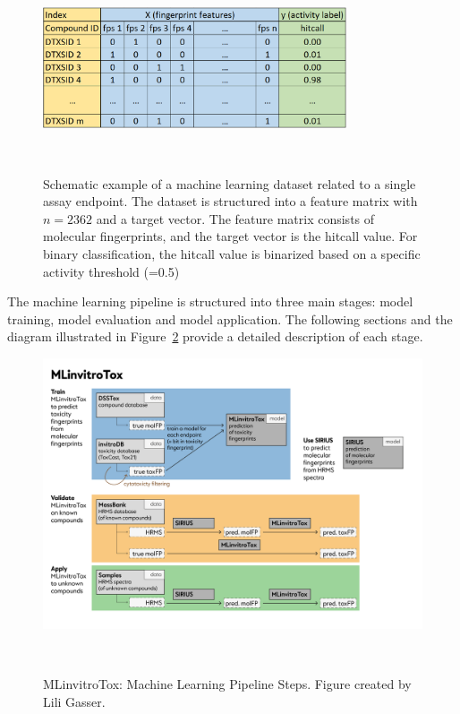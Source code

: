 \begin{figure}[h]
    \centering
    \includegraphics[width=0.8\textwidth]{figures/ml_dataset.png}
    \caption{Schematic example of a machine learning dataset related to a single assay endpoint. The dataset is structured into a feature matrix with $n=2362$ and a target vector. The feature matrix consists of molecular fingerprints, and the target vector is the hitcall value. For binary classification, the hitcall value is binarized based on a specific activity threshold (=0.5)}
~\label{fig:ml_dataset}
\end{figure}


The machine learning pipeline is structured into three main stages: model training, model evaluation and model application. The following sections and the diagram illustrated in Figure~\ref{fig:Project_overview} provide a detailed description of each stage.

\begin{figure}[h]
    \centering
    \includegraphics[width=1.0\textwidth]{figures/Project_overview.png}
    \caption{MLinvitroTox: Machine Learning Pipeline Steps. Figure created by Lili Gasser.}
~\label{fig:Project_overview}
\end{figure}

